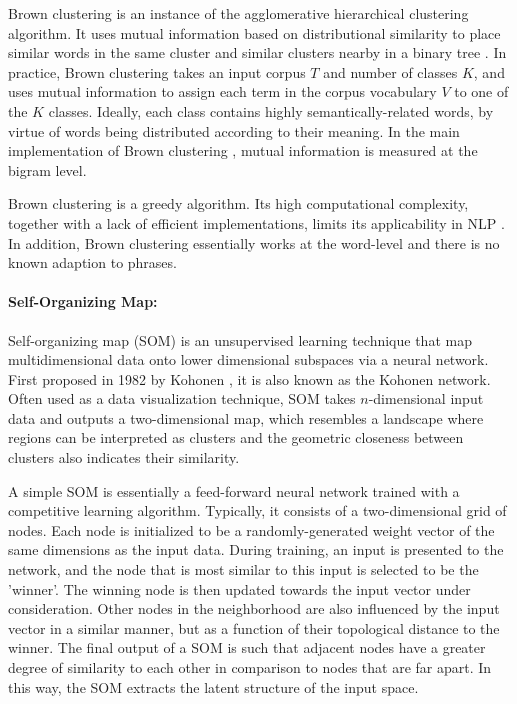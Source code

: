 Brown clustering \cite{Brown1992} is an instance of the agglomerative hierarchical clustering algorithm. It uses mutual information based on distributional similarity to place similar words in the same cluster and similar clusters nearby in a binary tree \cite{Derczynski2015}. In practice, Brown clustering takes an input corpus $T$ and number of classes $K$, and uses mutual information to assign each term in the corpus vocabulary $V$ to one of the $K$ classes. Ideally, each class contains highly semantically-related words, by virtue of words being distributed according to their meaning. In the main implementation of Brown clustering \cite{Liang2005}, mutual information is measured at the bigram level. 

Brown clustering is a greedy algorithm. Its high computational complexity, together with a lack of efficient implementations, limits its applicability in NLP \cite{ciosici2020}. In addition, Brown clustering essentially works at the word-level and there is no known adaption to phrases.



\paragraph{Self-Organizing Map:}
Self-organizing map (SOM) is an unsupervised learning technique that map multidimensional data onto lower dimensional subspaces via a neural network. First proposed in 1982 by Kohonen \cite{Kohonen1982,Kohonen2001}, it is also known as the Kohonen network. Often used as a data visualization technique, SOM takes $n$-dimensional input data and outputs a two-dimensional map, which resembles a landscape where regions can be interpreted as clusters and the geometric closeness between clusters also indicates their similarity.
 
A simple SOM is essentially a feed-forward neural network trained with a competitive learning algorithm. Typically, it consists of a two-dimensional grid of nodes. Each node is initialized to be a randomly-generated weight vector of the same dimensions as the input data. During training, an input is presented to the network, and the node that is most similar to this input is selected to be the 'winner'. The winning node is then updated towards the input vector under consideration. Other nodes in the neighborhood are also influenced by the input vector in a similar manner, but as a function of their topological distance to the winner. The final output of a SOM is such that adjacent nodes have a greater degree of similarity to each other in comparison to nodes that are far apart. In this way, the SOM extracts the latent structure of the input space.

